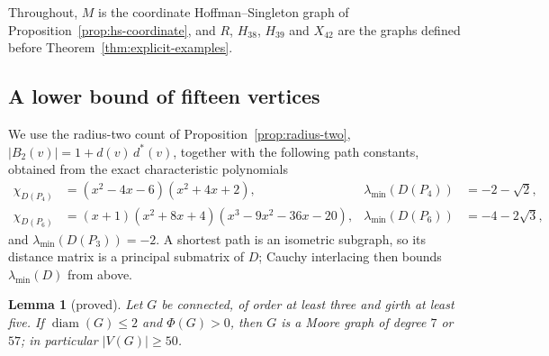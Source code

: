 \documentclass[a4paper,10pt,reqno]{amsart}
\theoremstyle{plain}
\newtheorem{lemma}[theorem]{Lemma}
\theoremstyle{definition}
\theoremstyle{remark}
\newcommand{\diam}{\operatorname{diam}}
\begin{document}
Throughout, \(M\) is the coordinate Hoffman--Singleton graph of
Proposition~\ref{prop:hs-coordinate}, and \(R\), \(H_{38}\), \(H_{39}\) and
\(X_{42}\) are the graphs defined before Theorem~\ref{thm:explicit-examples}.

\subsection{A lower bound of fifteen vertices}

We use the radius-two count of Proposition~\ref{prop:radius-two},
\(|B_2(v)|=1+d(v)\,d^*(v)\), together with the following path constants,
obtained from the exact characteristic polynomials
\begin{align*}
 \chi_{D(P_4)}&=(x^2-4x-6)(x^2+4x+2),&
 \lambda_{\min}(D(P_4))&=-2-\sqrt2,\\
 \chi_{D(P_6)}&=(x+1)(x^2+8x+4)(x^3-9x^2-36x-20),&
 \lambda_{\min}(D(P_6))&=-4-2\sqrt3,
\end{align*}
and \(\lambda_{\min}(D(P_3))=-2\). A shortest path is an isometric subgraph,
so its distance matrix is a principal submatrix of \(D\); Cauchy interlacing
then bounds \(\lambda_{\min}(D)\) from above.

\begin{lemma}[proved]\label{lem:small-diam-two}
Let \(G\) be connected, of order at least three and girth at least five. If
\(\diam(G)\le2\) and \(\Phi(G)>0\), then \(G\) is a Moore graph of degree
\(7\) or \(57\); in particular \(|V(G)|\ge50\).
\end{lemma}
\end{document}
